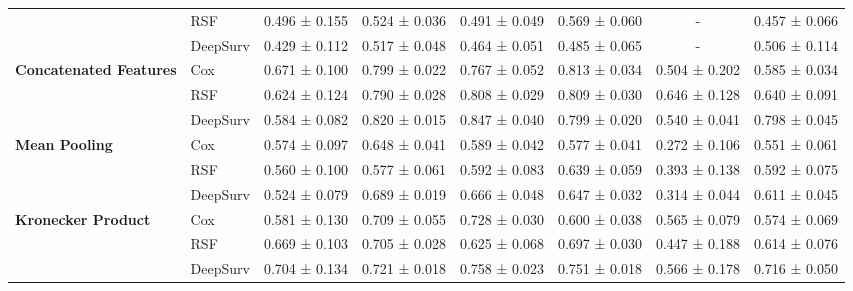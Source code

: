 \begin{sidewaystable}[htbp]
\begin{tabular}{@{}llcccccc@{}}
        & RSF & 0.496 ± 0.155 & 0.524 ± 0.036 & 0.491 ± 0.049 & 0.569 ± 0.060 & - & 0.457 ± 0.066 \\
        & DeepSurv & 0.429 ± 0.112 & 0.517 ± 0.048 & 0.464 ± 0.051 & 0.485 ± 0.065 & - & 0.506 ± 0.114 \\
        \midrule
        \multirow{3}{*}{\textbf{Concatenated Features}} & Cox & 0.671 ± 0.100 & 0.799 ± 0.022 & 0.767 ± 0.052 & 0.813 ± 0.034 & 0.504 ± 0.202 & 0.585 ± 0.034 \\
        & RSF & 0.624 ± 0.124 & 0.790 ± 0.028 & 0.808 ± 0.029 & 0.809 ± 0.030 & 0.646 ± 0.128 & 0.640 ± 0.091 \\
        & DeepSurv & 0.584 ± 0.082 & 0.820 ± 0.015 & 0.847 ± 0.040 & 0.799 ± 0.020 & 0.540 ± 0.041 & 0.798 ± 0.045 \\
        \midrule
        \multirow{3}{*}{\textbf{Mean Pooling}} & Cox & 0.574 ± 0.097 & 0.648 ± 0.041 & 0.589 ± 0.042 & 0.577 ± 0.041 & 0.272 ± 0.106 & 0.551 ± 0.061 \\
        & RSF & 0.560 ± 0.100 & 0.577 ± 0.061 & 0.592 ± 0.083 & 0.639 ± 0.059 & 0.393 ± 0.138 & 0.592 ± 0.075 \\
        & DeepSurv & 0.524 ± 0.079 & 0.689 ± 0.019 & 0.666 ± 0.048 & 0.647 ± 0.032 & 0.314 ± 0.044 & 0.611 ± 0.045 \\
        \midrule
        \multirow{3}{*}{\textbf{Kronecker Product}} & Cox & 0.581 ± 0.130 & 0.709 ± 0.055 & 0.728 ± 0.030 & 0.600 ± 0.038 & 0.565 ± 0.079 & 0.574 ± 0.069 \\
        & RSF & 0.669 ± 0.103 & 0.705 ± 0.028 & 0.625 ± 0.068 & 0.697 ± 0.030 & 0.447 ± 0.188 & 0.614 ± 0.076 \\
        & DeepSurv & 0.704 ± 0.134 & 0.721 ± 0.018 & 0.758 ± 0.023 & 0.751 ± 0.018 & 0.566 ± 0.178 & 0.716 ± 0.050 \\
        \bottomrule
    \end{tabular}
\end{sidewaystable}

